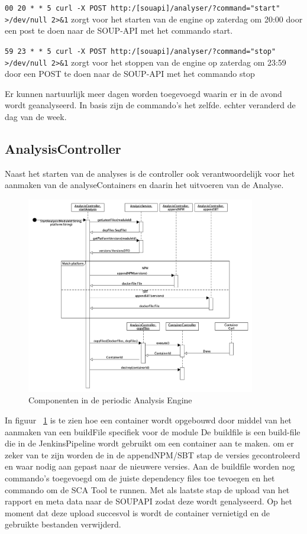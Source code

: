 \texttt{00 20 * * 5 curl -X POST http:/[souapi]/analyser/?command="start" >/dev/null 2>\&1} zorgt voor het starten van de engine op zaterdag om 20:00 door een post te doen naar de SOUP-API met het commando start.

\texttt{59 23 * * 5 curl -X POST http:/[souapi]/analyser/?command="stop" >/dev/null 2>\&1} zorgt voor het stoppen van de engine op zaterdag om 23:59 door een POST te doen naar de SOUP-API met het commando stop

Er kunnen nartuurlijk meer dagen worden toegevoegd waarin er in de avond wordt geanalyseerd. In basis zijn de commando's het zelfde. echter veranderd de dag van de week.

\subsection{AnalysisController}\label{subsec:analysiscontroller}
Naast het starten van de analyses is de controller ook verantwoordelijk voor het aanmaken van de analyseContainers en daarin het uitvoeren van de Analyse.
\begin{figure}[bth]
    \myfloatalign
    \includegraphics[width=10cm]{gfx/umlet/exports/PAE-CreateContainer}
    \caption{Componenten in de periodic Analysis Engine}
    \label{fig:paeSeq}
\end{figure}
In figuur ~\ref{fig:paeSeq} is te zien hoe een container wordt opgebouwd door middel van het aanmaken van een buildFile specifiek voor de module De buildfile is een build-file die in de JenkinsPipeline wordt gebruikt om een container aan te maken. om er zeker van te zijn worden de in de appendNPM/SBT stap de versies gecontroleerd en waar nodig aan gepast naar de nieuwere versies. Aan de buildfile worden nog commando's toegevoegd om de juiste dependency files toe tevoegen en het commando om de SCA Tool te runnen. Met als laatste stap de upload van het rapport en meta data naar de SOUPAPI zodat deze wordt genalyseerd. Op het moment dat deze upload succesvol is wordt de container vernietigd en de gebruikte bestanden verwijderd.
%

